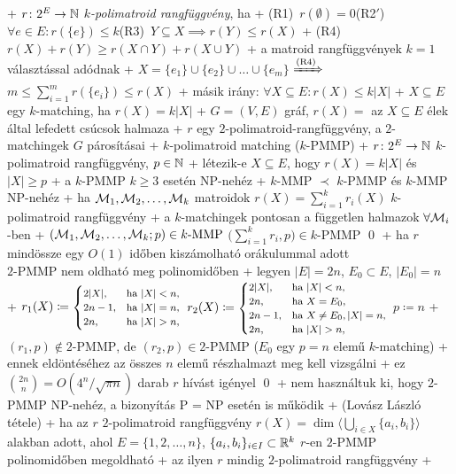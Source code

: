 + \dfn $r\colon 2^E \to \mathbb{N}$ \emph{$k$-polimatroid rangfüggvény}, ha
  + (R1)~$r(\emptyset) = 0$\qquad(R2$'$)~$\forall e \in E : r(\{e\})
    \le k$\qquad(R3)~$Y \subseteq X \implies r(Y) \le r(X)$
  + (R4)~$r(X) + r(Y) \ge r(X \cap Y) + r(X \cup Y)$
  + a matroid rangfüggvények $k = 1$ választással adódnak
    + $X = \{e_1\} \cup \{e_2\} \cup \ldots \cup \{e_m\}$
      $\xRightarrow{\text{(R4)}}$ $m \le \sum_{i = 1}^m r(\{e_i\}) \le
      r(X)$
  + másik irány: $\forall X \subseteq E : r(X) \le k \lvert X \rvert$
+ \dfn $X \subseteq E$ egy $k$-matching, ha $r(X) = k \lvert X \rvert$
+ \example $G = (V, E)$ gráf, $r(X) =$ az $X \subseteq E$ élek által
  lefedett csúcsok halmaza
  + $r$ egy $2$-polimatroid-rangfüggvény, a $2$-matchingek $G$
    párosításai
+ \prob $k$-polimatroid matching ($k$-PMMP)
  + \DataIn $r\colon 2^E \to \mathbb{N}$ $k$-polimatroid rangfüggvény, $p
    \in \mathbb{N}$
  + \DataOut létezik-e $X \subseteq E$, hogy $r(X) = k \lvert X
    \rvert$ és $\lvert X \rvert \ge p$
+ \thm a $k$-PMMP $k \ge 3$ esetén NP-nehéz
  + \proof $k$-MMP $\prec$ $k$-PMMP és $k$-MMP NP-nehéz
  + ha $\mathcal{M}_1, \mathcal{M}_2, \ldots, \mathcal{M}_k$ matroidok \RA $r(X) = \sum_{i =
    1}^k r_i(X)$ $k$-polimatroid rangfüggvény
    + a $k$-matchingek pontosan a  független halmazok $\forall \mathcal{M}_i$-ben
    + $(\mathcal{M}_1, \mathcal{M}_2, \ldots, \mathcal{M}_k; p) \in \text{$k$-MMP}$ \LRA%
      $\bigl(\sum_{i = 1}^k r_i, p\bigr) \in \text{$k$-PMMP}$ \qed
+ \thm ha $r$ mindössze egy $O(1)$ időben kiszámolható orákulummal
  adott \RA\\$2$-PMMP nem oldható meg polinomidőben
  + \proof legyen $\lvert E \rvert = 2n$, $E_0 \subset E$, $\lvert E_0
    \rvert = n$
  + $r_1(X) \coloneqq \text{\footnotesize$\begin{cases}
      2 \lvert X \rvert, &\text{ha $\lvert X \rvert < n$,} \\
      2n - 1, &\text{ha $\lvert X \rvert = n$,} \\
      2n, &\text{ha $\lvert X \rvert > n$,}
    \end{cases}$}$ $r_2(X) \coloneqq \text{\footnotesize$\begin{cases}
      2 \lvert X \rvert, &\text{ha $\lvert X \rvert < n$,} \\
      2n, &\text{ha $X = E_0$,} \\
      2n - 1, &\text{ha $X \ne E_0, \lvert X \rvert = n$,} \\
      2n, &\text{ha $\lvert X \rvert > n$,}
    \end{cases}$}$ $p \coloneqq n$
  + $(r_1, p) \notin \text{$2$-PMMP}$, de $(r_2, p) \in
    \text{$2$-PMMP}$ ($E_0$ egy $p = n$ elemű $k$-matching)
    + ennek eldöntéséhez az összes $n$ elemű részhalmazt meg kell vizsgálni
    + ez $\binom{2n}{n} = O(4^n / \sqrt{\pi n})$ darab $r$ hívást igényel \qed
  + nem használtuk ki, hogy $2$-PMMP NP-nehéz, a bizonyítás P = NP
    esetén is működik
+ \thm (Lovász László tétele)
  + ha az $r$ $2$-polimatroid rangfüggvény
    $r(X) = \operatorname{dim} \bigl\langle \bigcup_{i \in X} \{ a_i, b_i
    \} \bigr\rangle$ alakban adott, ahol $E = \{1, 2, \ldots, n\}$,
    $\{a_i, b_i\}_{i \in I} \subset \mathbb{R}^k$
    \RA $r$-en $2$-PMMP polinomidőben megoldható
  + az ilyen $r$ mindig $2$-polimatroid rangfüggvény
  + \noproof
